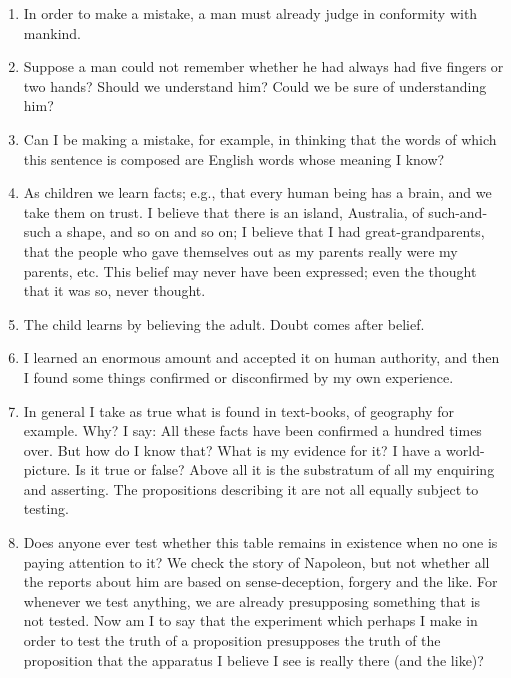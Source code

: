 \documentclass{book}
\begin{document}
\begin{enumerate}
\item
In order to make a mistake, a man must already judge in conformity with
mankind.

\item
Suppose a man could not remember whether he had always had five fingers or two
hands? Should we understand him? Could we be sure of understanding him?

\item
Can I be making a mistake, for example, in thinking that the words of which
this sentence is composed are English words whose meaning I know?

\item
As children we learn facts; e.g., that every human being has a brain, and we
take them on trust. I believe that there is an island, Australia, of
such-and-such a shape, and so on and so on; I believe that I had
great-grandparents, that the people who gave themselves out as my parents
really were my parents, etc. This belief may never have been expressed; even
the thought that it was so, never thought.

\item
The child learns by believing the adult. Doubt comes after belief.

\item
I learned an enormous amount and accepted it on human authority, and then I
found some things confirmed or disconfirmed by my own experience.

\item
In general I take as true what is found in text-books, of geography for
example. Why? I say: All these facts have been confirmed a hundred times over.
But how do I know that? What is my evidence for it? I have a world-picture. Is
it true or false? Above all it is the substratum of all my enquiring and
asserting. The propositions describing it are not all equally subject to
testing.

\item
Does anyone ever test whether this table remains in existence when no one is
paying attention to it?  We check the story of Napoleon, but not whether all
the reports about him are based on sense-deception, forgery and the like. For
whenever we test anything, we are already presupposing something that is not
tested. Now am I to say that the experiment which perhaps I make in order to
test the truth of a proposition presupposes the truth of the proposition that
the apparatus I believe I see is really there (and the like)?


\end{enumerate}
\end{document}
